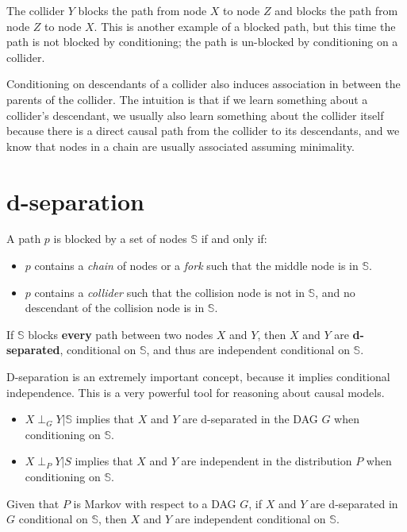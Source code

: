 The collider $Y$ blocks the path from node $X$ to node $Z$ and blocks the path
from node $Z$ to node $X$. This is another example of a blocked path, but this
time the path is not blocked by conditioning; the path is un-blocked by conditioning
on a collider.

Conditioning on descendants of a collider also induces association in between the
parents of the collider. The intuition is that if we learn something about a
collider's descendant, we usually also learn something about the collider itself
because there is a direct causal path from the collider to its descendants, and
we know that nodes in a chain are usually associated assuming minimality.
\section{d-separation}
\begin{definition}
    A path $p$ is blocked by a set of nodes $\mathbb{S}$ if and only if:
    \begin{itemize}
        \item $p$ contains a \textit{chain} of nodes or a \textit{fork} such that
              the middle node is in $\mathbb{S}$.
        \item $p$ contains a \textit{collider} such that the collision node is
              not in $\mathbb{S}$, and no descendant of the collision node is in
              $\mathbb{S}$.
    \end{itemize}
    If $\mathbb{S}$ blocks \textbf{every} path between two nodes $X$ and $Y$, then
    $X$ and $Y$ are \textbf{d-separated}, conditional on $\mathbb{S}$, and thus
    are independent conditional on $\mathbb{S}$.
\end{definition}
D-separation is an extremely important concept, because it implies conditional
independence. This is a very powerful tool for reasoning about causal models.
\begin{itemize}
    \item $X \perp_G Y | \mathbb{S}$ implies that $X$ and $Y$ are d-separated in the DAG
          $G$ when conditioning on $\mathbb{S}$.
    \item $X \perp_P Y | S$ implies that $X$ and $Y$ are independent in the
          distribution $P$ when conditioning on $\mathbb{S}$.
\end{itemize}
\begin{definition}
    Given that $P$ is Markov with respect to a DAG $G$, if $X$ and $Y$ are d-separated
    in $G$ conditional on $\mathbb{S}$, then $X$ and $Y$ are independent conditional
    on $\mathbb{S}$.
\end{definition}

